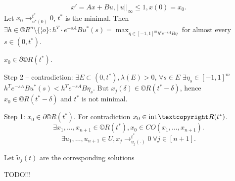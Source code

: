 \documentclass[12pt]{article}					%
\begin{document}
\begin{veta}
	$$ x' = Ax + Bu, ||u||_∞ ≤ 1, x(0) = x_0. $$
	Let $x_0 \rightarrow^{t^*}_{u^*(0)} 0$, $t^*$ is the minimal. Then $\exists h \in ®R^n \setminus \{¦o\}: h^T·e^{-s A} B u^*(s) = \max_{\eta \in [-1, 1]^m h^t e^{-sA} B \eta}$ for almost every $s \in (0, t^*)$.

	\begin{dukazin}
		$x_0 \in \partial ©R(t^*)$.

		Step 2 – contradiction: $\exists E \subset (0, t^*), \lambda(E) > 0$, $\forall s \in E$ $\exists \eta_s \in [-1, 1]^m$ $h^T e^{-sA}B u^*(s) < h^T e^{-sA} B \eta_s$. But $x_j(\delta) \in ©R(t^* - \delta)$, hence $x_0 \in ©R(t^* - \delta)$ and $t^*$ is not minimal.

		Step 1: $x_0 \in \partial ©R(t^*)$. For contradiction $x_0 \in \Int ©R(t^*)$.
		$$ \exists x_1, …, x_{n+1} \in ©R(t^*), x_0 \in CO(x_1, …, x_{n+1}). $$
		$$ \exists u_1, …, u_{n+1} \in U, x_j \rightarrow_{u_j(·)}^{t^*} 0\ \forall j \in [n+1]. $$

		Let $\tilde u_j(t)$ are the corresponding solutions

		TODO!!!
	\end{dukazin}
\end{veta}


\end{document}
